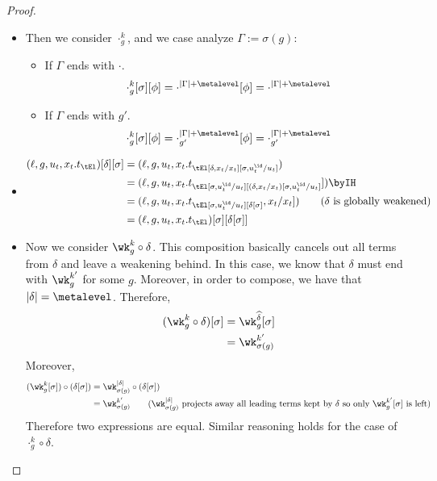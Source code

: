 \begin{proof}
\begin{itemize}[label=Case]
  \item
    Then we consider $\cdot^k_g$, and we case analyze $\Gamma := \sigma(g)$:
    \begin{itemize}[label=Subcase]
    \item If $\Gamma$ ends with $\cdot$. 
      \begin{align*}
        \cdot^k_g[\sigma][\phi]
        = \cdot^{|\Gamma| + \metalevel} [\phi] = \cdot^{|\Gamma| + \metalevel}
      \end{align*}
    \item If $\Gamma$ ends with $g'$. 
      \begin{align*}
        \cdot^k_g[\sigma][\phi]
        = \cdot^{|\Gamma| + \metalevel}_{g'} [\phi] = \cdot^{|\Gamma| + \metalevel}_{g'}
      \end{align*}
    \end{itemize}
    
  \item
    \begin{align*}
      (\ell,g,u_t,x_t. t_\tEl)[\delta][\sigma]
      &= (\ell,g,u_t,x_t. t_\tEl[\delta,x_t/x_t][\sigma,u_t^\id/u_t]) \\
      &= (\ell,g,u_t,x_t. t_\tEl[\sigma,u_t^\id/u_t][(\delta,x_t/x_t)[\sigma,u_t^\id/u_t]])
      \byIH \\
      &= (\ell,g,u_t,x_t. t_\tEl[\sigma,u_t^\id/u_t][\delta[\sigma],x_t/x_t])
      \tag{$\delta$ is globally weakened} \\
      &= (\ell,g,u_t,x_t. t_\tEl)[\sigma][\delta[\sigma]]
    \end{align*}
    
  \item Now we consider $\wk^k_g \circ \delta$. %
    This composition basically cancels out all terms from $\delta$ and leave a
    weakening behind. %
    In this case, we know that $\delta$ must end with $\wk^{k'}_g$ for some $g$. %
    Moreover, in order to compose, we have that $|\delta| = \metalevel$. %
    Therefore, 
    \begin{align*}
      (\wk^k_g \circ \delta) [\sigma]
      &= \wk^{\widehat \delta}_g[\sigma] \\
      &= \wk^{k'}_{\sigma(g)}
    \end{align*}
    Moreover,
    \begin{align*}
      (\wk^k_g[\sigma]) \circ (\delta[\sigma])
      &= \wk^{|\delta|}_{\sigma(g)} \circ (\delta[\sigma]) \\
      &= \wk^{k'}_{\sigma(g)}
        \tag{$\wk^{|\delta|}_{\sigma(g)}$ projects away all leading terms kept by
        $\delta$ so only $\wk^{k'}_{g}[\sigma]$ is left}
    \end{align*}
    Therefore two expressions are equal. %
    Similar reasoning holds for the case of $\cdot^k_g \circ \delta$. 
    

\end{itemize}
\end{proof}
